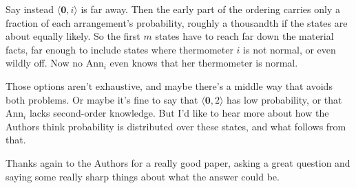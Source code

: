 \documentclass[
  11pt,
  letterpaper,
  DIV=11,
  numbers=noendperiod,
  twoside]{scrartcl}
\begin{document}
Say instead \(\langle \mathbf{0}, i\rangle\) is far away. Then the early
part of the ordering carries only a fraction of each arrangement's
probability, roughly a thousandth if the states are about equally
likely. So the first \(m\) states have to reach far down the material
facts, far enough to include states where thermometer \(i\) is not
normal, or even wildly off. Now no Ann\(_i\) even knows that her
thermometer is normal.

Those options aren't exhaustive, and maybe there's a middle way that
avoids both problems. Or maybe it's fine to say that
\(\langle \mathbf{0}, 2\rangle\) has low probability, or that Ann\(_i\)
lacks second-order knowledge. But I'd like to hear more about how the
Authors think probability is distributed over these states, and what
follows from that.

Thanks again to the Authors for a really good paper, asking a great
question and saying some really sharp things about what the answer could
be.



\vspace{12pt} \noindent ~~
\end{document}
